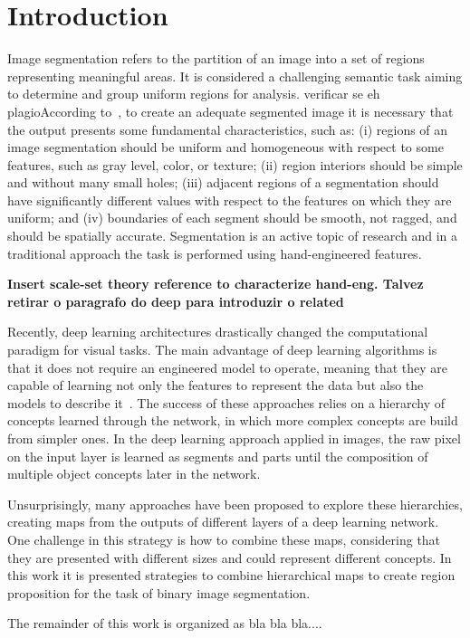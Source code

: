 \section{Introduction}
\label{sec:intro}

Image segmentation refers to the partition of an image into a set of regions representing  meaningful areas. It is considered a challenging semantic task aiming to determine and group uniform regions for analysis. {\color{green}verificar se eh plagio}According to~\cite{DOMINGUEZ}, to create an adequate segmented image it is necessary that the output presents some fundamental characteristics, such as: (i) regions of an image segmentation should be uniform and homogeneous with respect to some features, such as gray level, color, or texture; (ii) region interiors should be simple and without many small holes; (iii) adjacent regions of a segmentation should have significantly different values with respect to the features on which they are uniform; and (iv) boundaries of each segment should be smooth, not ragged, and should be spatially accurate. Segmentation is an active topic of research and in a traditional approach the task is performed using hand-engineered features.  

\textbf{Insert scale-set theory reference to characterize hand-eng. Talvez retirar o paragrafo do deep para introduzir o related}

Recently, deep learning architectures drastically changed the computational paradigm for visual tasks. The main advantage of deep learning algorithms is that it does not require an engineered model to operate, meaning that they are capable of learning not only the features to represent the data but also the models to describe it~\cite{goodfellow16}. The success of these approaches relies on a hierarchy of concepts learned through the network, in which more complex concepts are build from simpler ones. In the deep learning approach applied in images, the raw pixel on the input layer is learned as segments and parts until the composition of multiple object concepts later in the network.

Unsurprisingly, many approaches have been proposed to explore these hierarchies, creating maps from the outputs of different layers of a deep learning network. One challenge in this strategy is how to combine these maps, considering that they are presented with different sizes and could represent different concepts. In this work it is presented strategies to combine hierarchical maps to create region proposition for the task of binary image segmentation.   

The remainder of this work is organized as bla bla bla....

